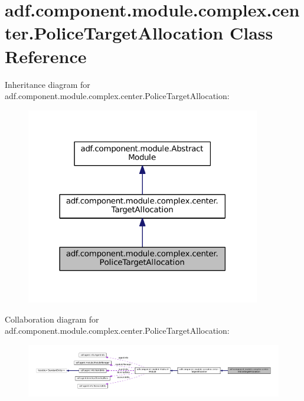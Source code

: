 \hypertarget{classadf_1_1component_1_1module_1_1complex_1_1center_1_1PoliceTargetAllocation}{}\section{adf.\+component.\+module.\+complex.\+center.\+Police\+Target\+Allocation Class Reference}
\label{classadf_1_1component_1_1module_1_1complex_1_1center_1_1PoliceTargetAllocation}


Inheritance diagram for adf.\+component.\+module.\+complex.\+center.\+Police\+Target\+Allocation\+:
\nopagebreak
\begin{figure}[H]
\begin{center}
\leavevmode
\includegraphics[width=290pt]{classadf_1_1component_1_1module_1_1complex_1_1center_1_1PoliceTargetAllocation__inherit__graph}
\end{center}
\end{figure}


Collaboration diagram for adf.\+component.\+module.\+complex.\+center.\+Police\+Target\+Allocation\+:
\nopagebreak
\begin{figure}[H]
\begin{center}
\leavevmode
\includegraphics[width=350pt]{classadf_1_1component_1_1module_1_1complex_1_1center_1_1PoliceTargetAllocation__coll__graph}
\end{center}
\end{figure}
